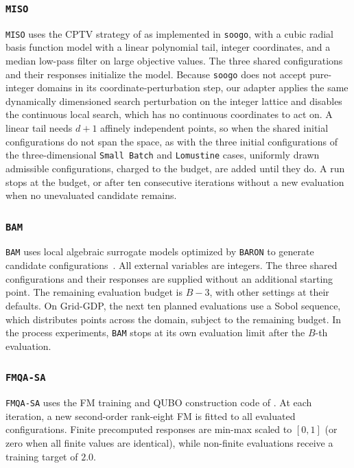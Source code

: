 \documentclass{article}
\begin{document}
\subsubsection{\texttt{MISO}}
\texttt{MISO} uses the CPTV strategy of \citet{muller2016miso} as implemented in \texttt{soogo}, with a cubic radial basis function model with a linear polynomial tail, integer coordinates, and a median low-pass filter on large objective values.
The three shared configurations and their responses initialize the model.
Because \texttt{soogo} does not accept pure-integer domains in its coordinate-perturbation step, our adapter applies the same dynamically dimensioned search perturbation on the integer lattice and disables the continuous local search, which has no continuous coordinates to act on.
A linear tail needs \(d+1\) affinely independent points, so when the shared initial configurations do not span the space, as with the three initial configurations of the three-dimensional \texttt{Small Batch} and \texttt{Lomustine} cases, uniformly drawn admissible configurations, charged to the budget, are added until they do.
A run stops at the budget, or after ten consecutive iterations without a new evaluation when no unevaluated candidate remains.

\subsubsection{\texttt{BAM}}
\texttt{BAM} uses local algebraic surrogate models optimized by \texttt{BARON} to generate candidate configurations~\citep{ma2023bam,bamManual}.
All external variables are integers.
The three shared configurations and their responses are supplied without an additional starting point.
The remaining evaluation budget is \(B-3\), with other settings at their defaults.
On Grid-GDP, the next ten planned evaluations use a Sobol sequence, which distributes points across the domain, subject to the remaining budget.
In the process experiments, \texttt{BAM} stops at its own evaluation limit after the \(B\)-th evaluation.

\subsubsection{\texttt{FMQA-SA}}
\texttt{FMQA-SA} uses the FM training and QUBO construction code of \citet{secquoiaBboFmqa}.
At each iteration, a new second-order rank-eight FM is fitted to all evaluated configurations.
Finite precomputed responses are min-max scaled to \([0,1]\) (or zero when all finite values are identical), while non-finite evaluations receive a training target of \(2.0\).
\end{document}
